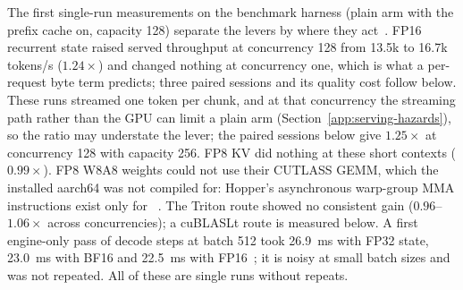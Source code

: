 The first single-run measurements on the benchmark harness (plain arm with the prefix cache on, capacity 128) separate the levers by where they act~. FP16 recurrent state raised served throughput at concurrency 128 from 13.5k to 16.7k tokens/s ($1.24\times$) and changed nothing at concurrency one, which is what a per-request byte term predicts; three paired sessions and its quality cost follow below. These runs streamed one token per chunk, and at that concurrency the streaming path rather than the GPU can limit a plain arm (Section~\ref{app:serving-hazards}), so the ratio may understate the lever; the paired sessions below give $1.25\times$ at concurrency 128 with capacity 256. FP8 KV did nothing at these short contexts ($0.99\times$). FP8 W8A8 weights could not use their CUTLASS GEMM, which the installed aarch64  was not compiled for: Hopper's asynchronous warp-group MMA instructions exist only for ~\cite{ptxisa}. The Triton route showed no consistent gain ($0.96$--$1.06\times$ across concurrencies); a cuBLASLt route is measured below. A first engine-only pass of decode steps at batch 512 took 26.9~ms with FP32 state, 23.0~ms with BF16 and 22.5~ms with FP16~; it is noisy at small batch sizes and was not repeated. All of these are single runs without repeats.

